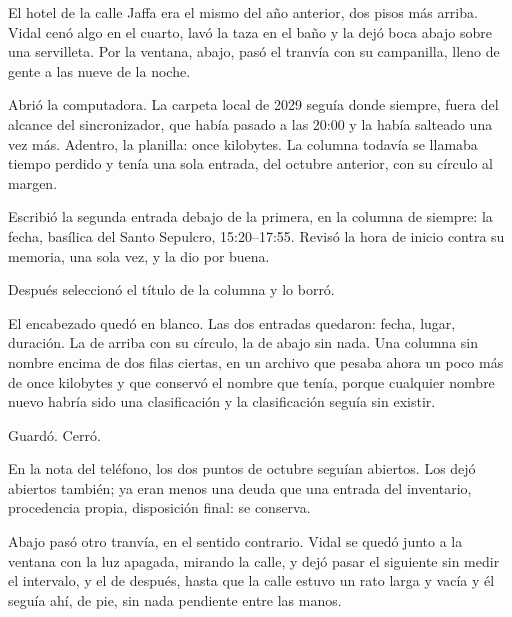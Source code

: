\scenebreak


El hotel de la calle Jaffa era el mismo del año anterior, dos pisos más arriba. Vidal cenó algo en el cuarto, lavó la taza en el baño y la dejó boca abajo sobre una servilleta. Por la ventana, abajo, pasó el tranvía con su campanilla, lleno de gente a las nueve de la noche.

Abrió la computadora. La carpeta local de 2029 seguía donde siempre, fuera del alcance del sincronizador, que había pasado a las 20:00 y la había salteado una vez más. Adentro, la planilla: once kilobytes. La columna todavía se llamaba tiempo perdido y tenía una sola entrada, del octubre anterior, con su círculo al margen.

Escribió la segunda entrada debajo de la primera, en la columna de siempre: la fecha, basílica del Santo Sepulcro, 15:20--17:55. Revisó la hora de inicio contra su memoria, una sola vez, y la dio por buena.

Después seleccionó el título de la columna y lo borró.

El encabezado quedó en blanco. Las dos entradas quedaron: fecha, lugar, duración. La de arriba con su círculo, la de abajo sin nada. Una columna sin nombre encima de dos filas ciertas, en un archivo que pesaba ahora un poco más de once kilobytes y que conservó el nombre que tenía, porque cualquier nombre nuevo habría sido una clasificación y la clasificación seguía sin existir.

Guardó. Cerró.

En la nota del teléfono, los dos puntos de octubre seguían abiertos. Los dejó abiertos también; ya eran menos una deuda que una entrada del inventario, procedencia propia, disposición final: se conserva.

Abajo pasó otro tranvía, en el sentido contrario. Vidal se quedó junto a la ventana con la luz apagada, mirando la calle, y dejó pasar el siguiente sin medir el intervalo, y el de después, hasta que la calle estuvo un rato larga y vacía y él seguía ahí, de pie, sin nada pendiente entre las manos.
